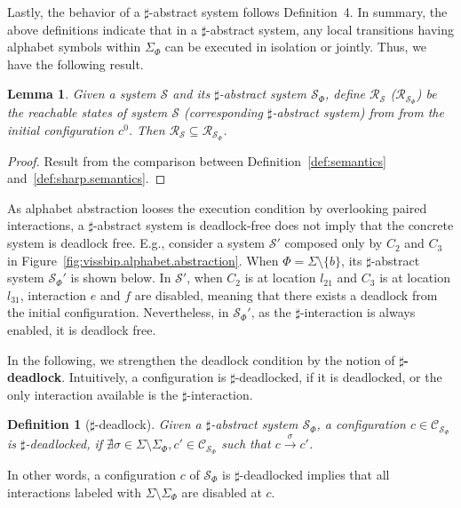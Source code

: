\documentclass[10pt, a4paper, onecolumn, conference, compsocconf]{IEEEtran}
\newcommand{\sys}{\mathcal{S}}
\newtheorem{defi}{Definition}
\newtheorem{lemma}{Lemma}
\begin{document}
\noindent Lastly, the behavior of a $\sharp$-abstract system follows Definition~4. In summary, the above definitions indicate that in a $\sharp$-abstract system, any local transitions having alphabet symbols within $\Sigma_{\Phi}$ can be executed in isolation or jointly. Thus, we have the following result.


\begin{lemma}\label{lem:simulation}
Given a system $\sys$ and its $\sharp$-abstract system $\sys_{\Phi}$,
define $\mathcal{R}_{\sys}$ ($\mathcal{R}_{\sys_{\Phi}}$) be the reachable states of system $\sys$ (corresponding $\sharp$-abstract system)
from from the initial configuration $c^0$. Then $\mathcal{R}_{\sys}\subseteq \mathcal{R}_{\sys_{\Phi}}$.
\end{lemma}

\begin{proof}
Result from the comparison between Definition~\ref{def:semantics} and~\ref{def:sharp.semantics}.
\end{proof}

As alphabet abstraction looses the execution condition by overlooking paired interactions,
a $\sharp$-abstract system is deadlock-free does not imply that the concrete system is deadlock free.
E.g., consider a system $\mathcal{S}'$ composed only by $C_2$ and $C_3$ in Figure~\ref{fig:vissbip.alphabet.abstraction}.
When $\Phi = \Sigma \setminus \{b\}$, its $\sharp$-abstract system $\mathcal{S}_{\Phi}'$ is shown below.
In $\mathcal{S'}$, when $C_2$ is at location $l_{21}$ and $C_3$ is at location $l_{31}$, interaction $e$ and $f$ are disabled, meaning that there exists a deadlock from the initial configuration. Nevertheless, in $\mathcal{S}_{\Phi}'$, as the $\sharp$-interaction is always enabled, it is deadlock free.

In the following, we strengthen the deadlock condition by the notion of \textbf{$\sharp$-deadlock}. Intuitively,
a configuration is $\sharp$-deadlocked, if it is deadlocked, or the only interaction available is the $\sharp$-interaction.

\begin{defi}[$\sharp$-deadlock]\label{def:sharplock}
Given a $\sharp$-abstract system $\sys_{\Phi}$, a configuration $c\in \mathcal{C}_{\mathcal{S}_{\Phi}}$ is $\sharp$-deadlocked, if
 $ \nexists \sigma \in \Sigma\setminus\Sigma_{\Phi}, c' \in \mathcal{C}_{\mathcal{S}_{\Phi}}$ such that $c\xrightarrow{\sigma} c'$.
\end{defi}
In other words, a configuration $c$ of $\sys_{\Phi}$ is $\sharp$-deadlocked implies that all interactions labeled with $\Sigma\setminus\Sigma_{\Phi}$ are disabled at $c$.
\end{document}

